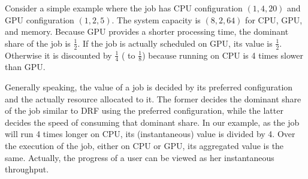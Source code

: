 


Consider a simple example where the job has CPU configuration $(1, 4, 20)$ and GPU configuration $(1, 2, 5)$. The system capacity is $(8, 2, 64)$ for CPU, GPU, and memory. 
Because GPU provides a shorter processing time, the dominant share of the job is $\frac{1}{2}$. If the job is actually scheduled on GPU, its value is $\frac{1}{2}$. Otherwise it is discounted by $\frac{1}{4}$ ( to $\frac{1}{8}$) because running on CPU is 4 times slower than GPU. 

Generally speaking, the value of a job is decided by its preferred configuration and the actually resource allocated to it. The former decides the dominant share of the job similar to DRF using the preferred configuration, while the latter decides the speed of consuming that dominant share. In our example, as the job will run 4 times longer on CPU, its (instantaneous) value is divided by 4. Over the execution of the job, either on CPU or GPU, its aggregated value is the same. 
Actually, the progress of a user can be viewed as her instantaneous throughput. %





